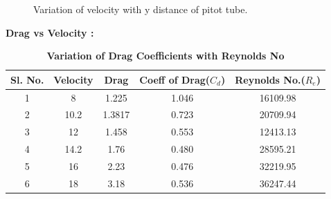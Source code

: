 \documentclass[12pt,a4paper]{article}
\begin{document}
\begin{figure}[!ht]
	\begin{center}
	\end{center}
	\caption{Variation of velocity with y distance of pitot tube.}
\end{figure}



\newpage









\newpage

\textbf{Drag vs Velocity : } 



\begin{table}[ht]
\centering
\caption{\textbf{Variation of Drag Coefficients with Reynolds No}}
\vspace{2mm}

\begin{tabular}{|c|c|c|c|c|} 
 \hline
Sl. No. & Velocity & Drag & Coeff of Drag($C_d$) & Reynolds No.($R_e$) \\ [0.1ex] 
 \hline \hline
1 & 8 & 1.225 & 1.046 & 16109.98   \\ 
 \hline
2 & 10.2 & 1.3817 & 0.723 & 20709.94  \\
 \hline
3 & 12 & 1.458 & 0.553 & 12413.13   \\
 \hline
4 & 14.2 & 1.76 & 0.480 & 28595.21   \\
 \hline
5 & 16 & 2.23 & 0.476 & 32219.95  \\
 \hline
6 & 18 & 3.18 & 0.536 & 36247.44 \\ 
 \hline


\end{tabular}
\end{table}
\end{document}
